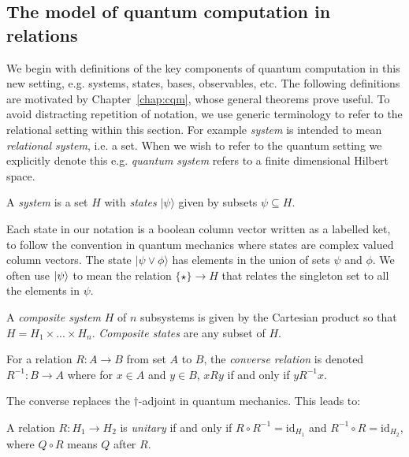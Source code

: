\subsection{The model of quantum computation in relations}

We begin with definitions of the key components of quantum computation in this new setting, e.g. systems, states, bases, observables, etc.  The following definitions are motivated by Chapter~\ref{chap:cqm}, whose general theorems prove useful. To avoid distracting repetition of notation, we use generic terminology to refer to the relational setting within this section.  For example \emph{system} is intended to mean \emph{relational system}, i.e. a set.  When we wish to refer to the quantum setting we explicitly denote this e.g. \emph{quantum system} refers to a finite dimensional Hilbert space.

\begin{axiom}
A \emph{system} is a set $H$ with \emph{states} $|\psi\rangle$ given by subsets $\psi\subseteq H$.
\end{axiom}


\noindent Each state in our notation is a boolean column vector written as a labelled ket, to follow the convention in quantum mechanics where states are complex valued column vectors. The state $|\psi\vee\phi\rangle$ has elements in the union of sets $\psi$ and $\phi$. We often use $| \psi \rangle$ to mean the relation $\{\star\}\to H$ that relates the singleton set to all the elements in $\psi$.

\begin{axiom}
A \emph{composite system} $H$ of $n$ subsystems is given by the Cartesian product so that $H = H_1\times...\times H_n$. \emph{Composite states} are any subset of $H$.
\end{axiom}

\begin{defn}
For a relation $R:A\to B$ from set $A$ to $B$, the \emph{converse relation} is denoted $R^{-1}:B\to A$ where for $x\in A$ and $y\in B$, $xRy$ if and only if $yR^{-1}x$.
\end{defn}

\noindent The converse replaces the $\dagger$-adjoint in quantum mechanics. This leads to:

\begin{defn}
A relation $R:H_1\to H_2$ is \emph{unitary} if and only if $R\circ R^{-1} = \mbox{id}_{H_1}$ and $R^{-1}\circ R = \mbox{id}_{H_2}$, where $Q\circ R$ means $Q$ after $R$.
\end{defn}

